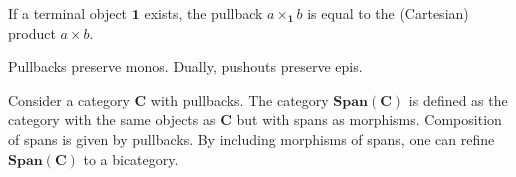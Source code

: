     \begin{property}[Product]
        If a terminal object $\mathbf{1}$ exists, the pullback $a\times_{\mathbf{1}}b$ is equal to the (Cartesian) product $a\times b$.
    \end{property}

    \begin{property}
        Pullbacks preserve monos. Dually, pushouts preserve epis.
    \end{property}

    \begin{property}\label{cat:span_category}
        Consider a category $\mathbf{C}$ with pullbacks. The category $\mathbf{Span}(\mathbf{C})$ is defined as the category with the same objects as $\mathbf{C}$ but with spans as morphisms. Composition of spans is given by pullbacks. By including morphisms of spans, one can refine $\mathbf{Span}(\mathbf{C})$ to a bicategory.
    \end{property}

